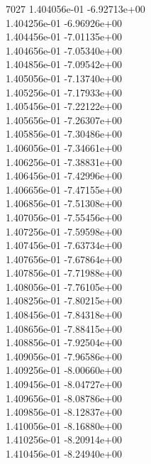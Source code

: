 7027	1.404056e-01	-6.92713e+00	\\ 	1.404256e-01	-6.96926e+00	\\ 	1.404456e-01	-7.01135e+00	\\ 	1.404656e-01	-7.05340e+00	\\ 	1.404856e-01	-7.09542e+00	\\ 	1.405056e-01	-7.13740e+00	\\ 	1.405256e-01	-7.17933e+00	\\ 	1.405456e-01	-7.22122e+00	\\ 	1.405656e-01	-7.26307e+00	\\ 	1.405856e-01	-7.30486e+00	\\ 	1.406056e-01	-7.34661e+00	\\ 	1.406256e-01	-7.38831e+00	\\ 	1.406456e-01	-7.42996e+00	\\ 	1.406656e-01	-7.47155e+00	\\ 	1.406856e-01	-7.51308e+00	\\ 	1.407056e-01	-7.55456e+00	\\ 	1.407256e-01	-7.59598e+00	\\ 	1.407456e-01	-7.63734e+00	\\ 	1.407656e-01	-7.67864e+00	\\ 	1.407856e-01	-7.71988e+00	\\ 	1.408056e-01	-7.76105e+00	\\ 	1.408256e-01	-7.80215e+00	\\ 	1.408456e-01	-7.84318e+00	\\ 	1.408656e-01	-7.88415e+00	\\ 	1.408856e-01	-7.92504e+00	\\ 	1.409056e-01	-7.96586e+00	\\ 	1.409256e-01	-8.00660e+00	\\ 	1.409456e-01	-8.04727e+00	\\ 	1.409656e-01	-8.08786e+00	\\ 	1.409856e-01	-8.12837e+00	\\ 	1.410056e-01	-8.16880e+00	\\ 	1.410256e-01	-8.20914e+00	\\ 	1.410456e-01	-8.24940e+00	\\ \hline
